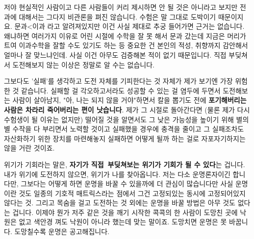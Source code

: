 저야 현실적인 사람이고 다른 사람들이 커리 제시하면 안 될 것은 아니라고 보지만
전과에 대해서는 그다지 비관론을 펴진 않습니다. 수험은 말 그대로 도박이기 때문이지요.
문과<이과 라고 알려져있지만 이건 사실 제대로 추궁 들어가면 근거는 없습니다.
왜냐하면 여러가지 이유로 어린 시절에 수학을 잘 못 해서 문과 갔는데 지금은 머리가 트여 이과수학을 잘할 수도 있기도 하는 등
중요한 건 본인의 적성, 취향까지 감안해서 얼마나 잘 맞느냐인데.
사실 이건 아무도 검증해본 적이 없기 때문입니다. 직접 부딪쳐서 도전해보지 않는 이상은 정말로 알 수는 없습니다.
\vspace{5mm}

그보다도 '실패'를 생각하고 도전 자체를 기피한다는 것 자체가 제가 보기엔 가장 위험한 것 같습니다.
실패할 걸 각오하고서라도 성공할 수 있는 걸 염두에 두면서 도전해보는 사람이 살아남지,
"아, 나는 되지 않을 거야"하면서 칼을 뽑기도 전에 \textbf{포기해버리는 사람은 차라리 죽어버리는 편이 낫습니다}.
제가 그 시절로 돌아간다면 (물론 제가 다시 수험생이 될 이유는 없지만)
떨어질 것을 알면서도 그 낮은 가능성을 높이기 위해 별의별 수작을 다 부리면서 노력할 것이고
실패했을 경우에 충격을 줄이고 그 실패조차도 자산화하기 위한 장치를 마련해놓지
실패하면 어떻게 될까 하는 걸로 자포자기하지는 않을 거란 것이죠.
\vspace{5mm}

위기가 기회라는 말은, \textbf{자기가 직접 부딪쳐보는 위기가 기회가 될 수 있다}는 겁니다.
내가 위기에 도전하지 않으면, 위기가 나를 찾아옵니다.
저는 다소 운명론자이긴 합니다만, 그보다는 어떻게 하면 운명을 바꿀 수 있을까에 더 관심이 많습니다만
사실 운명이란 것도 일종의 기호적 매트릭스라는 점에서 그건 고정되있는 동시에 고정되어있지 않다는 것.
그리고 목숨을 걸고 도전하는 것 외에는 운명을 바꿀 방법은 아무 것도 없다는 겁니다.
이제야 뭔가 저주 같은 것을 깨기 시작한 콕콕의 한 사람이 도망친 곳에 낙원은 없고 색안경 껴도 낙원이 아니라 했는데 맞는 말이죠.
도망치면 운명은 못 바꿉니다. 도망칠수록 운명은 공고해집니다.
\vspace{5mm}

